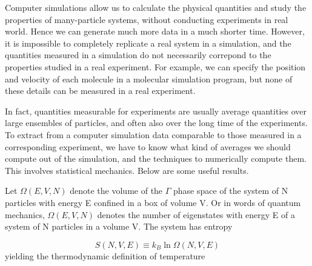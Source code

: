 \documentclass[letterpaper,12pt]{article}
\numberwithin{equation}{section}
\begin{document}
Computer simulations allow us to calculate the physical quantities and study the properties of many-particle systems, without conducting experiments in real world. Hence we can generate much more data in a much shorter time. However, it is impossible to completely replicate a real system in a simulation, and the quantities measured in a simulation do not necessarily correpond to 
the properties studied in a real experiment. For example, we can specify the position and velocity of each molecule in a molecular simulation program, but none of these details can be measured in a real experiment. 

In fact, quantities measurable for experiments are usually average quantities over large ensembles of particles, and often also over the long time of the experiments. To extract from a computer simulation data comparable to those measured in a corresponding experiment, we have to know what kind of averages we should compute out of the simulation, and the techniques to numerically compute them. This involves statistical mechanics. Below are some useful results.

Let $\Omega(E, V, N)$ denote the volume of the $\Gamma$ phase space of the system of N particles with energy E confined in a box of volume V. Or in words of quantum mechanics, $\Omega(E, V, N)$ denotes the number of eigenstates with energy E of a system of N particles in a volume V. The system has entropy 

\begin{equation}
    S(N, V, E)\equiv k_B\ln\Omega(N,V,E)
\end{equation}
yielding the thermodynamic definition of temperature
\end{document}
